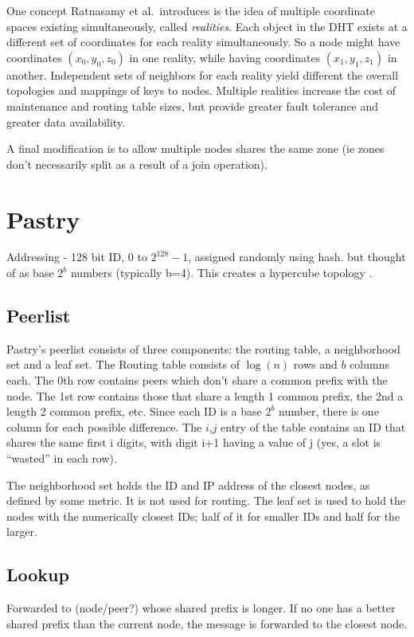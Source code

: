 \documentclass[10pt,letterpaper,twoside]{report}
\begin{document}
One concept Ratnasamy et al.\  introduces is the idea of multiple coordinate spaces existing simultaneously, called \textit{realities}. 
Each object in the DHT exists at a different set of coordinates for each reality simultaneously.
So a node might have coordinates $(x_0,y_0,z_0)$ in one reality, while having coordinates $(x_1,y_1,z_1)$ in another.
Independent sets of neighbors for each reality yield different the overall topologies and mappings of keys to nodes.
Multiple realities increase the cost of maintenance and routing table sizes, but provide greater fault tolerance and greater data availability.

A final modification is to allow multiple nodes shares the same zone (ie zones don't necessarily split as a result of a join operation).    








\section{Pastry}

Addressing - 128 bit ID, 0 to $2^{128} -1$, assigned randomly using hash.   but thought of as base $2^{b}$ numbers (typically b=4).  
This creates a hypercube topology \cite{induced}.

\subsection*{Peerlist}
Pastry's peerlist consists of three components: the routing table, a neighborhood set and a leaf set.  
The Routing table consists of $\log(n)$ rows and $b$ columns each. 
The 0th row contains peers which don't share a common prefix with the node.  
The 1st row contains those that share a length 1 common prefix, the 2nd a length 2 common prefix, etc.  
Since each ID is a base $2^b$ number, there is one column for each possible difference.   
The $i$,$j$ entry of the table contains an ID that shares the same first i digits, with digit i+1 having a value of j (yes, a slot is ``wasted'' in each row).

The neighborhood set holds the ID and IP address of the closest nodes, as defined by some metric.  
It is not used for routing.  
The leaf set is used to hold the nodes with the numerically closest IDs;  half of it for smaller IDs and half for the larger.


\subsection*{Lookup}
Forwarded to (node/peer?) whose shared prefix is longer.  If no one has a better shared prefix than the current node, the message is forwarded to the closest  node.
\end{document}
